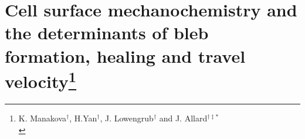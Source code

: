 \renewcommand{\thefootnote}{$\star$} 
\chapter[Cellular blebs]{Cell surface mechanochemistry and the determinants of bleb formation, healing and travel velocity\footnote{K. Manakova$^\dag$, H.Yan$^\dag$, J. Lowengrub$^\dag$ and J. Allard$^{\dag\ddag\ast}$\\
}}\label{chap:cellbleb}












